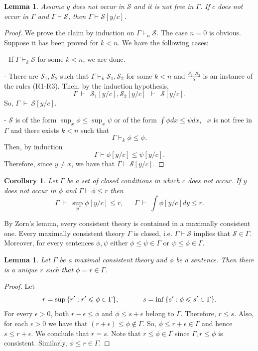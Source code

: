 \documentclass[12pt]{article}
\newtheorem{lemma}[theorem]{Lemma}
\newtheorem{corollary}[theorem]{Corollary}
\def\Sc{\mathcal S}
\begin{document}
\begin{lemma}\label{c1} Assume $y$ does not occur in $\Sc$ and it is not free in $\Gamma$.
If $c$ does not occur in $\Gamma$ and  $\Gamma\vdash\Sc$, then $\Gamma\vdash\Sc[y/c]$.
\end{lemma}
\begin{proof} We prove the claim by induction on $\Gamma\vdash_n\Sc$.
The case $n=0$ is obvious. Suppose it has been proved for $k<n$. We have the following cases:
\vspace{1mm}

- If $\Gamma\vdash_k\Sc$ for some $k<n$, we are done.
\vspace{1mm}

- There are $\Sc_1, \Sc_2$ such that
$\Gamma\vdash_k\Sc_1, \Sc_2$ for some $k<n$ and $\frac{\Sc_1, \Sc_2}{\Sc}$ is an instance of
the rules (R1-R3). Then, by the induction hypothesis,
$$\Gamma\ \vdash\ \ \Sc_1[y/c], \Sc_2[y/c]\ \ \vdash\ \ \Sc[y/c].$$
So, $\Gamma\ \vdash\ \Sc[y/c]$.
\vspace{1mm}

- $\Sc$ is of the form $\sup_x\phi\leqslant\sup_x\psi$ or of the form $\int\phi dx\leqslant\psi dx$, \
$x$ is not free in $\Gamma$ and there exists $k<n$ such that
$$\Gamma\vdash_k\phi\leqslant\psi.$$ Then, by induction $$\Gamma\vdash\phi[y/c]\leqslant\psi[y/c].$$
Therefore, since $y\neq x$, we have that $\Gamma\vdash\Sc[y/c]$.
\end{proof}

\begin{corollary}
Let $\Gamma$ be a set of closed conditions in which $c$ does not occur.
If $y$ does not occur in $\phi$ and $\Gamma\vdash\phi\leqslant r$ then
$$\Gamma\ \vdash\ \sup_y\phi[y/c]\leqslant r,\ \ \ \ \ \ \ \Gamma\ \vdash\ \int\phi[y/c]dy\leqslant r.$$
\end{corollary}
\vspace{2mm}

By Zorn's lemma, every consistent theory is contained in a maximally consistent one.
Every maximally consistent theory $\Gamma$ is closed, i.e. $\Gamma\vdash\Sc$ implies that $\Sc\in\Gamma$.
Moreover, for every sentences $\phi,\psi$ either $\phi\leqslant\psi\in\Gamma$ or $\psi\leqslant\phi\in\Gamma$.

\begin{lemma}\label{equality} Let $\Gamma$ be a maximal consistent theory and $\phi$ be a sentence.
Then there is a unique $r$ such that $\phi=r\in \Gamma$.
\end{lemma}
\begin{proof} Let
$$r=\sup{\{r': r'\leqslant\phi\in \Gamma}\},\hspace{12mm} s=\inf{\{s': \phi\leqslant s'\in \Gamma}\}.$$
For every $\epsilon>0$, both $r-\epsilon\leqslant\phi$ and $\phi\leqslant s+\epsilon$
belong to $\Gamma$. Therefore, $r\leqslant s$.
Also, for each $\epsilon>0$ we have that $(r+\epsilon)\leqslant\phi\notin\Gamma$.
So, $\phi\leqslant r+\epsilon\in \Gamma$ and hence $s\leqslant r+\epsilon$. We conclude that $r=s$.
Note that $r\leqslant\phi\in\Gamma$ since $\Gamma,r\leqslant\phi$ is consistent.
Similarly, $\phi\leqslant r\in \Gamma$.
\end{proof}
\end{document}
